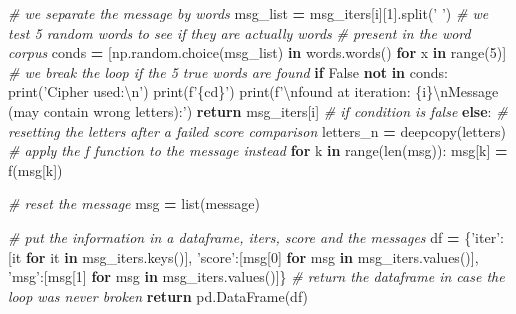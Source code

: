 \documentclass[]{article}
\newenvironment{Shaded}{\begin{snugshade}}{\end{snugshade}}
\newcommand{\BuiltInTok}[1]{#1}
\newcommand{\CharTok}[1]{\textcolor[rgb]{0.31,0.60,0.02}{#1}}
\newcommand{\CommentTok}[1]{\textcolor[rgb]{0.56,0.35,0.01}{\textit{#1}}}
\newcommand{\ControlFlowTok}[1]{\textcolor[rgb]{0.13,0.29,0.53}{\textbf{#1}}}
\newcommand{\DecValTok}[1]{\textcolor[rgb]{0.00,0.00,0.81}{#1}}
\newcommand{\KeywordTok}[1]{\textcolor[rgb]{0.13,0.29,0.53}{\textbf{#1}}}
\newcommand{\NormalTok}[1]{#1}
\newcommand{\OperatorTok}[1]{\textcolor[rgb]{0.81,0.36,0.00}{\textbf{#1}}}
\newcommand{\SpecialCharTok}[1]{\textcolor[rgb]{0.00,0.00,0.00}{#1}}
\newcommand{\SpecialStringTok}[1]{\textcolor[rgb]{0.31,0.60,0.02}{#1}}
\newcommand{\StringTok}[1]{\textcolor[rgb]{0.31,0.60,0.02}{#1}}
\newcommand{\VariableTok}[1]{\textcolor[rgb]{0.00,0.00,0.00}{#1}}
\begin{document}
\begin{Shaded}
\begin{Highlighting}[]
            \CommentTok{# we separate the message by words}
\NormalTok{            msg_list }\OperatorTok{=}\NormalTok{ msg_iters[i][}\DecValTok{1}\NormalTok{].split(}\StringTok{' '}\NormalTok{)}
            \CommentTok{# we test 5 random words to see if they are actually words }
            \CommentTok{# present in the word corpus}
\NormalTok{            conds }\OperatorTok{=}\NormalTok{ [np.random.choice(msg_list) }\KeywordTok{in}\NormalTok{ words.words() }\ControlFlowTok{for}\NormalTok{ x }\KeywordTok{in} \BuiltInTok{range}\NormalTok{(}\DecValTok{5}\NormalTok{)]}
            \CommentTok{# we break the loop if the 5 true words are found}
            \ControlFlowTok{if} \VariableTok{False} \KeywordTok{not} \KeywordTok{in}\NormalTok{ conds:}
                \BuiltInTok{print}\NormalTok{(}\StringTok{'Cipher used:}\CharTok{\textbackslash{}n}\StringTok{'}\NormalTok{)}
                \BuiltInTok{print}\NormalTok{(}\SpecialStringTok{f'}\SpecialCharTok{\{cd\}}\SpecialStringTok{'}\NormalTok{)}
                \BuiltInTok{print}\NormalTok{(}\SpecialStringTok{f'}\CharTok{\textbackslash{}n}\SpecialStringTok{found at iteration: }\SpecialCharTok{\{i\}}\CharTok{\textbackslash{}n}\SpecialStringTok{Message (may contain wrong letters):'}\NormalTok{)}
                \ControlFlowTok{return}\NormalTok{ msg_iters[i]}
        \CommentTok{# if condition is false}
        \ControlFlowTok{else}\NormalTok{:}
            \CommentTok{# resetting the letters after a failed score comparison}
\NormalTok{            letters_n }\OperatorTok{=}\NormalTok{ deepcopy(letters)}
            \CommentTok{# apply the f function to the message instead}
            \ControlFlowTok{for}\NormalTok{ k }\KeywordTok{in} \BuiltInTok{range}\NormalTok{(}\BuiltInTok{len}\NormalTok{(msg)):}
\NormalTok{                msg[k] }\OperatorTok{=}\NormalTok{ f(msg[k])}
        
        \CommentTok{# reset the message}
\NormalTok{        msg }\OperatorTok{=} \BuiltInTok{list}\NormalTok{(message)}

    \CommentTok{# put the information in a dataframe, iters, score and the messages}
\NormalTok{    df }\OperatorTok{=}\NormalTok{ \{}\StringTok{'iter'}\NormalTok{:[it }\ControlFlowTok{for}\NormalTok{ it }\KeywordTok{in}\NormalTok{ msg_iters.keys()],}
          \StringTok{'score'}\NormalTok{:[msg[}\DecValTok{0}\NormalTok{] }\ControlFlowTok{for}\NormalTok{ msg }\KeywordTok{in}\NormalTok{ msg_iters.values()],}
          \StringTok{'msg'}\NormalTok{:[msg[}\DecValTok{1}\NormalTok{] }\ControlFlowTok{for}\NormalTok{ msg }\KeywordTok{in}\NormalTok{ msg_iters.values()]\}}
    \CommentTok{# return the dataframe in case the loop was never broken}
    \ControlFlowTok{return}\NormalTok{ pd.DataFrame(df)}
\end{Highlighting}
\end{Shaded}
\end{document}
